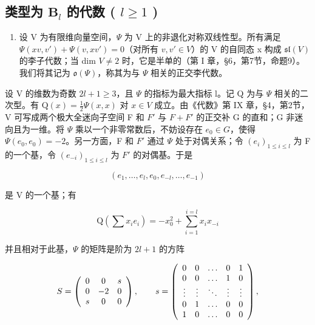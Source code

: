 \subsection{\texorpdfstring{类型为 \(\mathbf{B}_l\) 的代数 ( \(l \geq 1\) )}{类型为 \textbackslash mathbf\{B\}\_l 的代数 ( l \textbackslash geq 1 )}}

\begin{enumerate}
\def\labelenumi{(\Roman{enumi})}
\tightlist
\item
  设 V 为有限维向量空间，\(\Psi\) 为 V 上的非退化对称双线性型。所有满足 \(\Psi(xv,v') + \Psi(v, xv') = 0\)（对所有 \(v, v' \in V\)）的 V 的自同态 x 构成 \(\mathfrak{sl}(V)\) 的李子代数；当 dim \(V \neq 2\) 时，它是半单的（第 I 章，§6，第7节，命题9）。我们将其记为 \(\mathfrak{o}(\Psi)\)，称其为与 \(\Psi\) 相关的正交李代数。
\end{enumerate}

设 V 的维数为奇数 \(2l + 1 \geq 3\)，且 \(\Psi\) 的指标为最大指标 l。记 Q 为与 \(\Psi\) 相关的二次型。有 \(\mathrm{Q}(x)=\frac{1}{2}\varPsi(x,x)\) 对 \(x\in V\) 成立。由《代数》第 IX 章，§4，第2节，V 可写成两个极大全迷向子空间 F 和 \(F'\) 与 \(F+F'\) 的正交补 G 的直和；G 非迷向且为一维。将 \(\varPsi\) 乘以一个非零常数后，不妨设存在 \(e_{0}\in G\)，使得 \(\varPsi(e_{0},e_{0})=-2\)。另一方面，F 和 \(F'\) 通过 \(\varPsi\) 处于对偶关系；令 \((e_{i})_{1\leq i\leq l}\) 为 F 的一个基，令 \((e_{-i})_{1\leq i\leq l}\) 为 \(F'\) 的对偶基。于是

\[
(e _ {1}, \ldots , e _ {l}, e _ {0}, e _ {- l}, \ldots , e _ {- 1})
\]

是 V 的一个基；有

\[
\mathrm{Q} \left(\sum x _ {i} e _ {i}\right) = - x _ {0} ^ {2} + \sum_ {i = 1} ^ {i = l} x _ {i} x _ {- i}
\]

并且相对于此基，\(\varPsi\) 的矩阵是阶为 \(2l + 1\) 的方阵

\[
S = \left( \begin{array}{c c c} 0 & 0 & s \\ 0 & - 2 & 0 \\ s & 0 & 0 \end{array} \right), \qquad s = \left( \begin{array}{c c c c c} 0 & 0 & \dots & 0 & 1 \\ 0 & 0 & \dots & 1 & 0 \\ \vdots & \vdots & \ddots & \vdots & \vdots \\ 0 & 1 & \dots & 0 & 0 \\ 1 & 0 & \dots & 0 & 0 \end{array} \right),
\]

